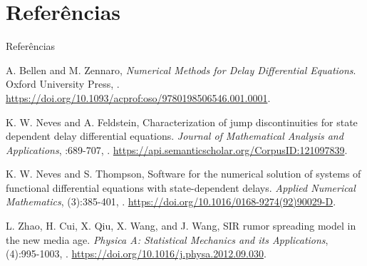 \documentclass{beamer}
\theoremstyle{plain}
\theoremstyle{definition}
\begin{document}
\section{Referências}
\begin{frame}{Referências}


\begin{thebibliography}{4}

\tiny

\beamertemplatebookbibitems
{}
A. Bellen and M. Zennaro,
\newblock \emph{Numerical Methods for Delay Differential Equations}.
\newblock Oxford University Press,
.
\newblock \url{https://doi.org/10.1093/acprof:oso/9780198506546.001.0001}.

\beamertemplatearticlebibitems
{}
K. W. Neves and A. Feldstein,
\newblock Characterization of jump discontinuities for state dependent delay differential equations.
\newblock \emph{Journal of Mathematical Analysis and Applications},
:689-707,
.
\newblock \url{https://api.semanticscholar.org/CorpusID:121097839}.



 
%
%
%
%
%



\beamertemplatearticlebibitems
{}
K. W. Neves and S. Thompson,
\newblock Software for the numerical solution of systems of functional differential equations with state-dependent delays.
\newblock \emph{Applied Numerical Mathematics},
(3):385-401,
.
\newblock \url{https://doi.org/10.1016/0168-9274(92)90029-D}.
 

\beamertemplatearticlebibitems
{}
L. Zhao, H. Cui, X. Qiu, X. Wang, and J. Wang,
\newblock SIR rumor spreading model in the new media age.
\newblock \emph{Physica A: Statistical Mechanics and its Applications},
(4):995-1003,
.
\newblock \url{https://doi.org/10.1016/j.physa.2012.09.030}.


 
\end{thebibliography}
\end{frame}
\end{document}
